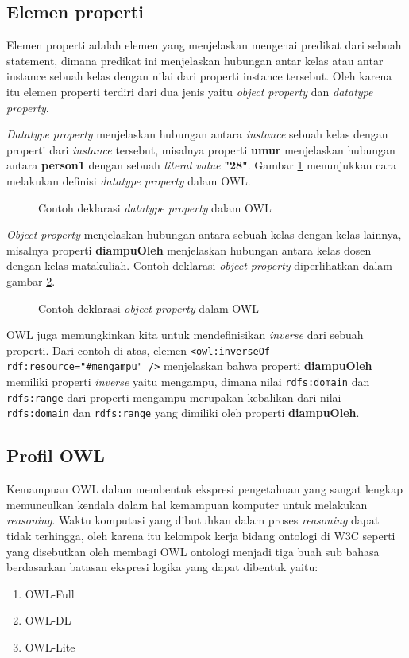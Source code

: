 \subsection{Elemen properti}
Elemen properti adalah elemen yang menjelaskan mengenai predikat dari sebuah statement, dimana predikat ini menjelaskan hubungan antar kelas atau antar instance sebuah kelas dengan nilai dari properti instance tersebut. Oleh karena itu elemen properti terdiri dari dua jenis yaitu \emph{object property} dan \emph{datatype property}.

\emph{Datatype property} menjelaskan hubungan antara \textit{instance} sebuah kelas dengan properti dari \textit{instance} tersebut, misalnya properti \textbf{umur} menjelaskan hubungan antara \textbf{person1} dengan sebuah \emph{literal value} \textbf{"28"}. Gambar \ref{fig:deklarasi_dp_owl} menunjukkan cara melakukan definisi \emph{datatype property} dalam OWL.
\begin{figure}[hb]
	\centering
	
	\caption{Contoh deklarasi \emph{datatype property} dalam OWL}
	\label{fig:deklarasi_dp_owl}
\end{figure}

\emph{Object property} menjelaskan hubungan antara sebuah kelas dengan kelas lainnya, misalnya properti \textbf{diampuOleh} menjelaskan hubungan antara kelas dosen dengan kelas matakuliah. Contoh deklarasi \emph{object property} diperlihatkan dalam gambar \ref{fig:deklarasi_op_owl}.
\begin{figure}[ht]
	\centering
	
	\caption{Contoh deklarasi \emph{object property} dalam OWL}
	\label{fig:deklarasi_op_owl}
\end{figure}

OWL juga memungkinkan kita untuk mendefinisikan \emph{inverse} dari sebuah properti. Dari contoh di atas, elemen \texttt{<owl:inverseOf rdf:resource="\#mengampu" />} menjelaskan bahwa properti \textbf{diampuOleh} memiliki properti \emph{inverse} yaitu mengampu, dimana nilai \texttt{rdfs:domain} dan \texttt{rdfs:range} dari properti mengampu merupakan kebalikan dari nilai \texttt{rdfs:domain} dan \texttt{rdfs:range} yang dimiliki oleh properti \textbf{diampuOleh}.

\subsection{Profil OWL}
Kemampuan OWL dalam membentuk ekspresi pengetahuan yang sangat lengkap memunculkan kendala dalam hal kemampuan komputer untuk melakukan \emph{reasoning}. Waktu komputasi yang dibutuhkan dalam proses \emph{reasoning} dapat tidak terhingga, oleh karena itu kelompok kerja bidang ontologi di W3C seperti yang disebutkan oleh \citet*{mcguinness_vanharmelen} membagi OWL ontologi menjadi tiga buah sub bahasa berdasarkan batasan ekspresi logika yang dapat dibentuk yaitu:
\begin{enumerate}
	\item OWL-Full
	\item OWL-DL
	\item OWL-Lite
\end{enumerate}

